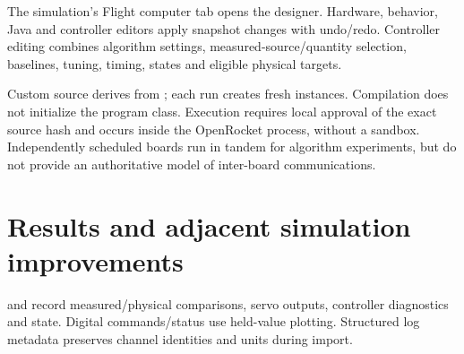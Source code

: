 The simulation's Flight computer tab opens the designer. Hardware, behavior,
Java and controller editors apply snapshot changes with undo/redo. Controller
editing combines algorithm settings, measured-source/quantity selection,
baselines, tuning, timing, states and eligible physical targets.

Custom source derives from ; each run creates fresh
instances. Compilation does not initialize the program class. Execution
requires local approval of the exact source hash and occurs inside the
OpenRocket process, without a sandbox. Independently scheduled boards run
in tandem for algorithm experiments, but do not provide an authoritative
model of inter-board communications.

\clearpage
\section{Results and adjacent simulation improvements}
 and  record
measured/physical comparisons, servo outputs, controller diagnostics and state.
Digital commands/status use held-value plotting. Structured log metadata
preserves channel identities and units during import.


